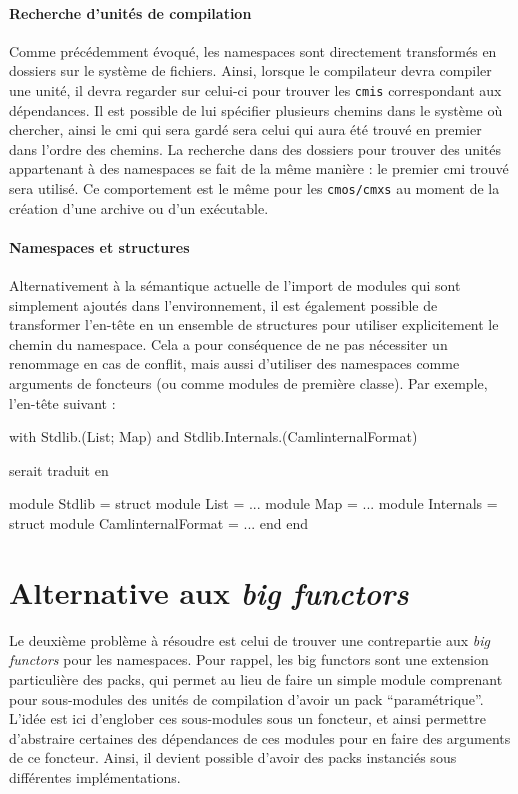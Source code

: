 \documentclass[11pt,a4paper]{report}
\begin{document}
\paragraph{Recherche d'unités de compilation}

Comme précédemment évoqué, les namespaces sont directement transformés en
dossiers sur le système de fichiers. Ainsi, lorsque le compilateur devra
compiler une unité, il devra regarder sur celui-ci pour trouver les
\texttt{cmis} correspondant aux dépendances. Il est possible de lui spécifier
plusieurs chemins dans le système où chercher, ainsi le cmi qui sera gardé sera
celui qui aura été trouvé en premier dans l'ordre des chemins. La recherche dans
des dossiers pour trouver des unités appartenant à des namespaces se fait de la
même manière : le premier cmi trouvé sera utilisé. Ce comportement est le même
pour les \texttt{cmos/cmxs} au moment de la création d'une archive ou d'un
exécutable.

\paragraph{Namespaces et structures}

Alternativement à la sémantique actuelle de l'import de modules qui sont
simplement ajoutés dans l'environnement, il est également possible de
transformer l'en-tête en un ensemble de structures pour utiliser explicitement le
chemin du namespace. Cela a pour conséquence de ne pas nécessiter un renommage
en cas de conflit, mais aussi d'utiliser des namespaces comme arguments de
foncteurs (ou comme modules de première classe). Par exemple, l'en-tête suivant
:
\begin{OCaml}
with Stdlib.(List; Map)
and Stdlib.Internals.(CamlinternalFormat)
\end{OCaml}
serait traduit en
\begin{OCaml}
module Stdlib =
  struct
    module List = ...
    module Map = ...
    module Internals =
      struct
        module CamlinternalFormat = ...
      end
  end
\end{OCaml}

\section{Alternative aux \emph{big functors}}

Le deuxième problème à résoudre est celui de trouver une contrepartie aux
\emph{big functors} pour les namespaces. Pour rappel, les big functors sont une
extension particulière des packs, qui permet au lieu de faire un simple module
comprenant pour sous-modules des unités de compilation d'avoir un pack
``paramétrique''. L'idée est ici d'englober ces sous-modules sous un foncteur, et
ainsi permettre d'abstraire certaines des dépendances de ces modules pour en
faire des arguments de ce foncteur. Ainsi, il devient possible d'avoir des packs
instanciés sous différentes implémentations.
\end{document}
